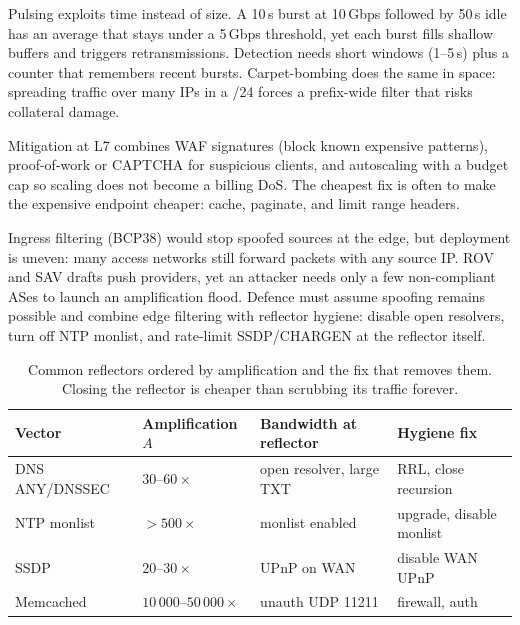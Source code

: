 Pulsing exploits time instead of size. A 10\,s burst at 10\,Gbps followed by 50\,s idle has an average that stays under a 5\,Gbps threshold, yet each burst fills shallow buffers and triggers retransmissions. Detection needs short windows (1--5\,s) plus a counter that remembers recent bursts. Carpet-bombing does the same in space: spreading traffic over many IPs in a /24 forces a prefix-wide filter that risks collateral damage.

Mitigation at L7 combines WAF signatures (block known expensive patterns), proof-of-work or CAPTCHA for suspicious clients, and autoscaling with a budget cap so scaling does not become a billing DoS. The cheapest fix is often to make the expensive endpoint cheaper: cache, paginate, and limit range headers.


\begin{remark}\label{rem:bcp38}
Ingress filtering (BCP38) would stop spoofed sources at the edge, but deployment is uneven: many access networks still forward packets with any source IP. ROV and SAV drafts push providers, yet an attacker needs only a few non-compliant ASes to launch an amplification flood. Defence must assume spoofing remains possible and combine edge filtering with reflector hygiene: disable open resolvers, turn off NTP monlist, and rate-limit SSDP/CHARGEN at the reflector itself.
\end{remark}

\begin{table}[h]\centering\small
\begin{tabular}{l l l l}
\toprule \textbf{Vector} & \textbf{Amplification $A$} & \textbf{Bandwidth at reflector} & \textbf{Hygiene fix} \\ \midrule
DNS ANY/DNSSEC & $30$--$60\times$ & open resolver, large TXT & RRL, close recursion \\
NTP monlist & $>500\times$ & monlist enabled & upgrade, disable monlist \\
SSDP & $20$--$30\times$ & UPnP on WAN & disable WAN UPnP \\
Memcached & $10\,000$--$50\,000\times$ & unauth UDP 11211 & firewall, auth \\ \bottomrule
\end{tabular}
\caption{Common reflectors ordered by amplification and the fix that removes them. Closing the reflector is cheaper than scrubbing its traffic forever.}
\label{tab:reflectors}
\end{table}

